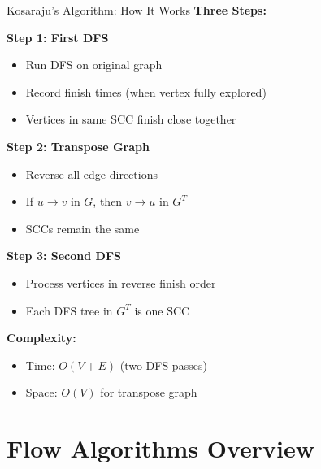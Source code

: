 \documentclass[aspectratio=169]{beamer}
\begin{document}
\begin{frame}{Kosaraju's Algorithm: How It Works}
  \textbf{Three Steps:}

  \vspace{0.3cm}
  \textbf{Step 1: First DFS}
  \begin{itemize}
    \item Run DFS on original graph
    \item Record finish times (when vertex fully explored)
    \item Vertices in same SCC finish close together
  \end{itemize}

  \vspace{0.3cm}
  \textbf{Step 2: Transpose Graph}
  \begin{itemize}
    \item Reverse all edge directions
    \item If $u \rightarrow v$ in $G$, then $v \rightarrow u$ in $G^T$
    \item SCCs remain the same
  \end{itemize}

  \vspace{0.3cm}
  \textbf{Step 3: Second DFS}
  \begin{itemize}
    \item Process vertices in reverse finish order
    \item Each DFS tree in $G^T$ is one SCC
  \end{itemize}

  \vspace{0.3cm}
  \textbf{Complexity:}
  \begin{itemize}
    \item Time: $O(V + E)$ (two DFS passes)
    \item Space: $O(V)$ for transpose graph
  \end{itemize}
\end{frame}

\section{Flow Algorithms Overview}
\end{document}

